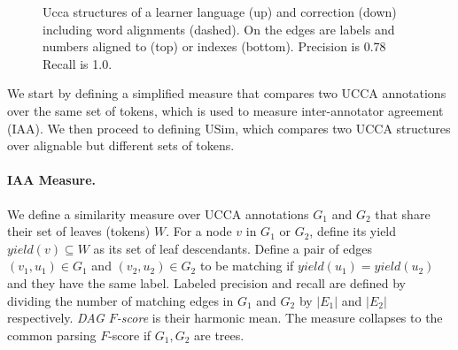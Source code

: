 \documentclass[a4paper, 11pt]{article}
\begin{document}
\begin{figure}[t]
				\caption{\label{fig:example}
					Ucca structures of a learner language (up) and correction (down) including word alignments (dashed). On the edges are labels and numbers aligned to (top) or indexes (bottom). Precision is 0.78 Recall is 1.0.
				}
			\end{figure}
We start by defining a simplified measure that compares two UCCA annotations over the 
same set of tokens, which is used to measure inter-annotator agreement (IAA). We then
proceed to defining {\sc USim}, which compares two UCCA structures
over alignable but different sets of tokens.

\paragraph{IAA Measure.} We define a similarity measure over UCCA annotations 
$G_1$ and $G_2$ that share their set of leaves (tokens) $W$.
For a node $v$ in $G_1$ or $G_2$, define its yield $yield(v) \subseteq W$ as its
set of leaf descendants.
Define a pair of edges $(v_1,u_1) \in G_1$ and $(v_2,u_2) \in G_2$ to be matching
if $yield(u_1) = yield(u_2)$ and they have the same label.
Labeled precision and recall are defined by dividing the number of matching edges
in $G_1$ and $G_2$ by $|E_1|$ and $|E_2|$ respectively.
{\it DAG $F$-score} is their harmonic mean.
The measure collapses to the common parsing $F$-score if $G_1, G_2$ are trees.
\end{document}
